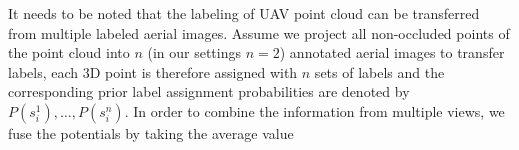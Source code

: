 


It needs to be noted that the labeling of UAV point cloud can be transferred from multiple labeled aerial images. Assume we project all non-occluded points of the point cloud into $n$ (in our settings $n = 2$) annotated aerial images to transfer labels, each 3D point is therefore assigned with $n$ sets of labels and the corresponding prior label assignment probabilities are denoted by $P\left(s_i^1\right), \dots, P\left(s_i^n\right)$. In order to combine the information from multiple views, we fuse the potentials by taking the average value

